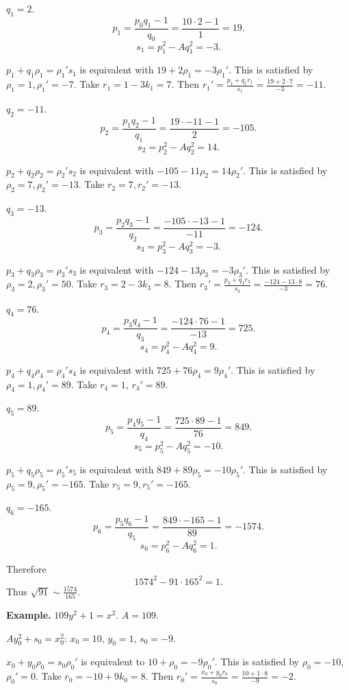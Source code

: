 \documentclass{article}
\theoremstyle{definition}
\theoremstyle{definition}
\begin{document}
$q_1=2$.
\[
p_1 = \frac{p_0q_1-1}{q_0} = \frac{10 \cdot 2 - 1}{1} = 19.
\]
\[
s_1 = p_1^2 - Aq_1^2 = -3.
\]

$p_1+q_1\rho_1=\rho_1's_1$ is equivalent with
$19+2\rho_1=-3\rho_1'$. This is satisfied by
$\rho_1=1, \rho_1'=-7$.
Take $r_1 = 1 - 3k_1 = 7$. 
Then $r_1' = \frac{p_1+q_1r_1}{s_1}
=\frac{19 + 2 \cdot 7}{-3} = -11$.

$q_2=-11$.
\[
p_2 = \frac{p_1q_2-1}{q_1} = \frac{19 \cdot -11-1}{2} = -105.
\]
\[
s_2 = p_2^2 - Aq_2^2 = 14.
\]

$p_2+q_2\rho_2=\rho_2's_2$
is equivalent with 
$-105-11\rho_2 = 14 \rho_2'$.  
This is satisfied by
$\rho_2=7, \rho_2'=-13$.
Take $r_2=7, r_2'=-13$.

$q_3=-13$.
\[
p_3 = \frac{p_2q_3-1}{q_2} = \frac{-105 \cdot -13 - 1}{-11} = -124.
\]
\[
s_3 = p_3^2-Aq_3^2 = -3.
\]

$p_3+q_3\rho_3=\rho_3's_3$ 
is equivalent with
$-124-13\rho_3 = -3\rho_3'$.
This is satisfied by $\rho_3=2, \rho_3'=50$.
Take 
$r_3 = 2 - 3k_3 = 8$. Then
$r_3'=\frac{p_3+q_3r_3}{s_3} = \frac{-124 - 13 \cdot 8}{-3} = 76$.

$q_4=76$.
\[
p_4 = \frac{p_3q_4-1}{q_3}
=\frac{-124 \cdot 76-1}{-13} = 725.
\]
\[
s_4 = p_4^2-Aq_4^2 = 9.
\]

$p_4+q_4\rho_4=\rho_4's_4$ 
is equivalent with
$725 + 76\rho_4 = 9\rho_4'$.
This is satisfied by $\rho_4=1, \rho_4'=89$.
Take $r_4 = 1$, $r_4'=89$.

$q_5=89$.
\[
p_5 =  \frac{p_4q_5-1}{q_4}
=\frac{725 \cdot 89 -1}{76} = 849.
\]
\[
s_5 = p_5^2 - Aq_5^2 = -10.
\]

$p_5+q_5\rho_5=\rho_5's_5$ 
is equivalent with
$849+89\rho_5 = -10\rho_5'$.
This is satisfied by 
$\rho_5=9, \rho_5'=-165$.
Take $r_5=9, r_5'=-165$.

$q_6=-165$.
\[
p_6 =  \frac{p_5q_6-1}{q_5} = \frac{849 \cdot -165-1}{89} = -1574.
\]
\[
s_6 = p_6^2 - Aq_6^2 = 1.
\]

Therefore
\[
1574^2 - 91 \cdot 165^2 = 1.
\]
Thus $\sqrt{91} \sim \frac{1574}{165}$. 




\textbf{Example.} $109y^2+1=x^2$.
$A=109$.

$Ay_0^2+s_0=x_0^2$:
$x_0=10$, $y_0=1$, $s_0=-9$. 

$x_0+y_0 \rho_0 = s_0 \rho_0'$ is equivalent to
$10 +\rho_0= - 9\rho_0'$. This is satisfied by
$\rho_0=-10$, $\rho_0'=0$.
Take $r_0 = -10 + 9k_0 = 8$. 
Then $r_0'= \frac{x_0+y_0r_0}{s_0}=
\frac{10+1 \cdot 8}{-9} = -2$.
\end{document}
